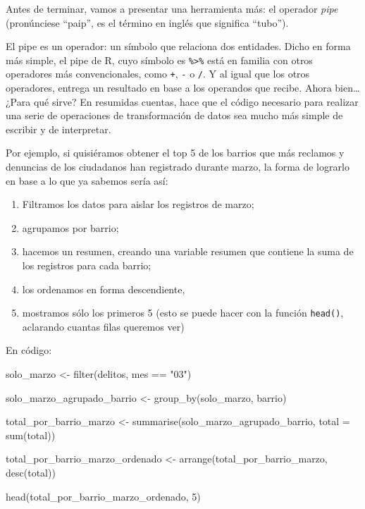 \documentclass[
]{book}
\newenvironment{Shaded}{\begin{snugshade}}{\end{snugshade}}
\newcommand{\AttributeTok}[1]{\textcolor[rgb]{0.77,0.63,0.00}{#1}}
\newcommand{\DecValTok}[1]{\textcolor[rgb]{0.00,0.00,0.81}{#1}}
\newcommand{\FunctionTok}[1]{\textcolor[rgb]{0.00,0.00,0.00}{#1}}
\newcommand{\NormalTok}[1]{#1}
\newcommand{\OtherTok}[1]{\textcolor[rgb]{0.56,0.35,0.01}{#1}}
\newcommand{\SpecialCharTok}[1]{\textcolor[rgb]{0.00,0.00,0.00}{#1}}
\newcommand{\StringTok}[1]{\textcolor[rgb]{0.31,0.60,0.02}{#1}}
\providecommand{\tightlist}{%
  \setlength{\itemsep}{0pt}\setlength{\parskip}{0pt}}
\begin{document}
Antes de terminar, vamos a presentar una herramienta más: el operador \emph{pipe} (pronúnciese ``paip'', es el término en inglés que significa ``tubo'').

El pipe es un operador: un símbolo que relaciona dos entidades. Dicho en forma más simple, el pipe de R, cuyo símbolo es \texttt{\%\textgreater{}\%} está en familia con otros operadores más convencionales, como \texttt{+}, \texttt{-} o \texttt{/}. Y al igual que los otros operadores, entrega un resultado en base a los operandos que recibe. Ahora bien\ldots{} ¿Para qué sirve? En resumidas cuentas, hace que el código necesario para realizar una serie de operaciones de transformación de datos sea mucho más simple de escribir y de interpretar.

Por ejemplo, si quisiéramos obtener el top 5 de los barrios que más reclamos y denuncias de los ciudadanos han registrado durante marzo, la forma de lograrlo en base a lo que ya sabemos sería así:

\begin{enumerate}
\def\labelenumi{\arabic{enumi}.}
\tightlist
\item
  Filtramos los datos para aislar los registros de marzo;
\item
  agrupamos por barrio;
\item
  hacemos un resumen, creando una variable resumen que contiene la suma de los registros para cada barrio;
\item
  los ordenamos en forma descendiente,
\item
  mostramos sólo los primeros 5 (esto se puede hacer con la función \texttt{head()}, aclarando cuantas filas queremos ver)
\end{enumerate}

En código:

\begin{Shaded}
\begin{Highlighting}[]
\NormalTok{solo\_marzo }\OtherTok{\textless{}{-}} \FunctionTok{filter}\NormalTok{(delitos, mes }\SpecialCharTok{==} \StringTok{"03"}\NormalTok{)}

\NormalTok{solo\_marzo\_agrupado\_barrio }\OtherTok{\textless{}{-}} \FunctionTok{group\_by}\NormalTok{(solo\_marzo, barrio)}

\NormalTok{total\_por\_barrio\_marzo }\OtherTok{\textless{}{-}} \FunctionTok{summarise}\NormalTok{(solo\_marzo\_agrupado\_barrio, }\AttributeTok{total =} \FunctionTok{sum}\NormalTok{(total))}

\NormalTok{total\_por\_barrio\_marzo\_ordenado }\OtherTok{\textless{}{-}} \FunctionTok{arrange}\NormalTok{(total\_por\_barrio\_marzo, }\FunctionTok{desc}\NormalTok{(total))}

\FunctionTok{head}\NormalTok{(total\_por\_barrio\_marzo\_ordenado, }\DecValTok{5}\NormalTok{)}
\end{Highlighting}
\end{Shaded}
\end{document}
